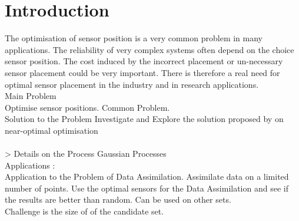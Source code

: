 \chapter{Introduction}



The optimisation of sensor position is a very common problem in many applications. The reliability of very complex systems often depend on the choice sensor position. The cost induced by the incorrect placement or un-necessary sensor placement could be very important. There is therefore a real need for optimal sensor placement in the industry and in research applications. \\

Main Problem \\
Optimise sensor positions. Common Problem. \\



Solution to the Problem
Investigate and Explore the solution proposed by \citet{krause_near-optimal_2008} on near-optimal optimisation \\
\\ > Details on the Process
Gaussian Processes \\


Applications : \\
Application to the Problem of Data Assimilation. Assimilate data on a limited number of points. Use the optimal sensors for the Data Assimilation and see if the results are better than random.  Can be used on other sets.  \\

Challenge is the size of of the candidate set. \\


 







